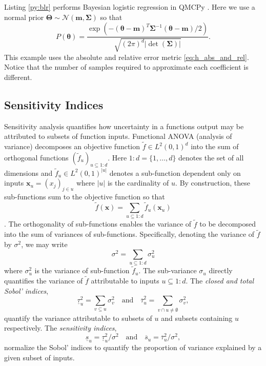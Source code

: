 \documentclass[graybox]{svmult}
\begin{document}
Listing \ref{py:blr} performs Bayesian logistic regression in QMCPy
. Here we use a normal prior $\boldsymbol{\Theta} \sim \mathcal{N}(\boldsymbol{m},\boldsymbol{\Sigma})$ so that
$$P(\boldsymbol{\theta}) = \frac{\exp\left(-(\boldsymbol{\theta}-\boldsymbol{m})^T\boldsymbol{\Sigma}^{-1}(\boldsymbol{\theta}-\boldsymbol{m})/2\right)}{\sqrt{(2\pi)^d\lvert \det(\boldsymbol{\Sigma})\rvert }}.$$
This example uses the absolute and relative error metric \eqref{eq:h_abs_and_rel}. Notice that the number of samples required to approximate each coefficient is different. 



\subsection{Sensitivity Indices}

Sensitivity analysis quantifies how uncertainty in a functions output may be attributed to subsets of function inputs. Functional ANOVA (analysis of variance) decomposes an objective function $\tilde{f} \in L^2(0,1)^{d}$ into the sum of orthogonal functions $(\tilde{f}_u)_{u \subseteq 1:d}$. Here $1:d=\{1,\dots,d\}$ denotes the set of all dimensions and $\tilde{f}_u \in L^2(0,1)^{\lvert u \rvert}$ denotes a sub-function dependent only on inputs $\boldsymbol{x}_u = (x_j)_{j \in u}$ where $\lvert u \rvert$ is the cardinality of $u$. By construction, these sub-functions sum to the objective function so that
\begin{equation}
    \tilde{f}(\boldsymbol{x}) = \sum_{u \subseteq 1:d} \tilde{f}_u(\boldsymbol{x}_u) 
    \label{eq:fanova}
\end{equation}
\cite[Appendix A]{mcbook}. The orthogonality of sub-functions enables the variance of $\tilde{f}$ to be decomposed into the sum of variances of sub-functions. Specifically, denoting the variance of $\tilde{f}$ by $\sigma^2$, we may write
\begin{equation*}
    \sigma^2 = \sum_{u \subseteq 1:d} \sigma^2_u
\end{equation*}
where $\sigma^2_u$ is the variance of sub-function $\tilde{f}_u$. The sub-variance $\sigma_u$ directly quantifies the variance of $\tilde{f}$ attributable to inputs $u \subseteq 1:d$.  The \emph{closed and total Sobol' indices},
\begin{equation*}
    \underline{\tau}_u^2 = \sum_{v \subseteq u} \sigma^2_v \quad \text{and} \quad 
    \overline{\tau}_u^2 = \sum_{v \cap u \neq \emptyset} \sigma^2_v,
    \label{eq:sobol_indices}
\end{equation*}
quantify the variance attributable to subsets of $u$ and subsets containing $u$ respectively. The \emph{sensitivity indices},
\begin{equation*}
    \underline{s}_u = \underline{\tau}_u^2/\sigma^2 \quad \text{and} \quad 
    \overline{s}_u = \overline{\tau}_u^2/\sigma^2,
    \label{eq:sensitivity_indices_og}
\end{equation*}
normalize the Sobol' indices to quantify the proportion of variance explained by a given subset of inputs. 
\end{document}
